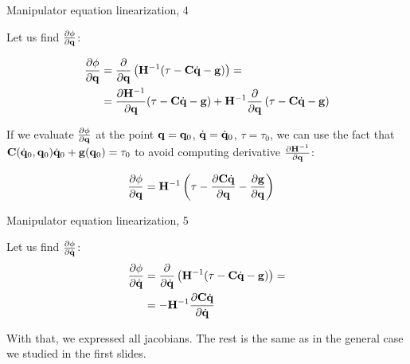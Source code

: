 \documentclass{beamer}
\begin{document}
\begin{frame}{Manipulator equation linearization, 4}
	\begin{flushleft}
		
		Let us find $\frac{\partial \phi}{\partial \mathbf{q}}$:
		
		\begin{align}
			\frac{\partial \phi}{\partial \mathbf{q}}
			&=
			\frac{\partial }{\partial \mathbf{q}} \left(\mathbf{H}^{-1} (\tau - \mathbf{C} \dot{\mathbf{q}} - \mathbf{g} ) \right)
			= \\
			&=
			\frac{\partial \mathbf{H}^{-1}}{\partial \mathbf{q}} (\tau - \mathbf{C} \dot{\mathbf{q}} - \mathbf{g} )
			+
			\mathbf{H}^{-1} \frac{\partial }{\partial \mathbf{q}} \left( \tau - \mathbf{C} \dot{\mathbf{q}} - \mathbf{g} \right)
		\end{align}
		
		If we evaluate $\frac{\partial \phi}{\partial \mathbf{q}}$ at the point $\mathbf{q} = \mathbf{q}_0$, $\dot{\mathbf{q}} = \dot{\mathbf{q}}_0$, $\tau = \tau_0$, we can use the fact that $\mathbf{C}(\dot{\mathbf{q}}_0, \mathbf{q}_0) \dot{\mathbf{q}}_0 + \mathbf{g}(\mathbf{q}_0) = \tau_0$ to avoid computing derivative $\frac{\partial \mathbf{H}^{-1}}{\partial \mathbf{q}}$:
		
		\begin{align}
			\frac{\partial \phi}{\partial \mathbf{q}}
			&=
			\mathbf{H}^{-1} \left( \tau - \frac{\partial \mathbf{C}\dot{\mathbf{q}}}{\partial \mathbf{q}}  - \frac{\partial \mathbf{g}}{\partial \mathbf{q}} \right)
		\end{align}
		
	\end{flushleft}
\end{frame}




\begin{frame}{Manipulator equation linearization, 5}
	\begin{flushleft}
		
		Let us find $\frac{\partial \phi}{\partial \dot{\mathbf{q}}}$:
		\begin{align}
			\frac{\partial \phi}{\partial \dot{\mathbf{q}}}
			&=
			\frac{\partial }{\partial \dot{\mathbf{q}}} \left(\mathbf{H}^{-1} (\tau - \mathbf{C} \dot{\mathbf{q}} - \mathbf{g} ) \right)
			= \\
			&=
			-\mathbf{H}^{-1}\frac{\partial \mathbf{C} \dot{\mathbf{q}}}{\partial \dot{\mathbf{q}}}
		\end{align}
		
	With that, we expressed all jacobians. The rest is the same as in the general case we studied in the first slides.
		
	\end{flushleft}
\end{frame}
\end{document}
